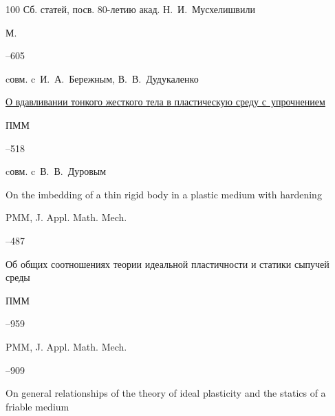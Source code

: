 \begin{thebibliography}{100}
\bookinfo Сб. статей, посв. 80-летию акад. Н.~И.~Мусхелишвили

\publaddr М.


–605 

\miscnote cовм. c~И.~А.~Бережным, В.~В.~Дудукаленко






\paper  \href{https://zbmath.org/?q=an:0261.73030}{О вдавливании тонкого жесткого тела в пластическую среду с~упрочнением}

\jour ПММ




–518

\miscnote cовм. c~В.~В.~Дуровым


\transl 


\paper On the imbedding of a thin rigid body in a plastic medium with hardening

\jour PMM, J. Appl. Math. Mech. 



--487 







\paper Об общих соотношениях теории идеальной пластичности и статики сыпучей среды 

\jour ПММ




–959

\transl

\jour PMM, J. Appl. Math. Mech. 



--909

\paper On general relationships of the theory of ideal plasticity and the statics of a friable medium









\end{thebibliography}
